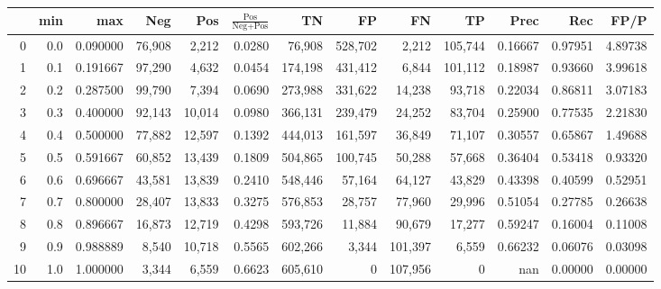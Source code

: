 \begin{tabular}{rrrrrrrrrrrrr}
\toprule
{} &  min &       max &     Neg &     Pos & $\frac{\text{Pos}}{\text{Neg}+\text{Pos}}$ &       TN &       FP &       FN &       TP &     Prec &      Rec &     FP/P \\
\midrule
0  &  0.0 &  0.090000 &  76,908 &   2,212 &                                     0.0280 &   76,908 &  528,702 &    2,212 &  105,744 &  0.16667 &  0.97951 &  4.89738 \\
1  &  0.1 &  0.191667 &  97,290 &   4,632 &                                     0.0454 &  174,198 &  431,412 &    6,844 &  101,112 &  0.18987 &  0.93660 &  3.99618 \\
2  &  0.2 &  0.287500 &  99,790 &   7,394 &                                     0.0690 &  273,988 &  331,622 &   14,238 &   93,718 &  0.22034 &  0.86811 &  3.07183 \\
3  &  0.3 &  0.400000 &  92,143 &  10,014 &                                     0.0980 &  366,131 &  239,479 &   24,252 &   83,704 &  0.25900 &  0.77535 &  2.21830 \\
4  &  0.4 &  0.500000 &  77,882 &  12,597 &                                     0.1392 &  444,013 &  161,597 &   36,849 &   71,107 &  0.30557 &  0.65867 &  1.49688 \\
5  &  0.5 &  0.591667 &  60,852 &  13,439 &                                     0.1809 &  504,865 &  100,745 &   50,288 &   57,668 &  0.36404 &  0.53418 &  0.93320 \\
6  &  0.6 &  0.696667 &  43,581 &  13,839 &                                     0.2410 &  548,446 &   57,164 &   64,127 &   43,829 &  0.43398 &  0.40599 &  0.52951 \\
7  &  0.7 &  0.800000 &  28,407 &  13,833 &                                     0.3275 &  576,853 &   28,757 &   77,960 &   29,996 &  0.51054 &  0.27785 &  0.26638 \\
8  &  0.8 &  0.896667 &  16,873 &  12,719 &                                     0.4298 &  593,726 &   11,884 &   90,679 &   17,277 &  0.59247 &  0.16004 &  0.11008 \\
9  &  0.9 &  0.988889 &   8,540 &  10,718 &                                     0.5565 &  602,266 &    3,344 &  101,397 &    6,559 &  0.66232 &  0.06076 &  0.03098 \\
10 &  1.0 &  1.000000 &   3,344 &   6,559 &                                     0.6623 &  605,610 &        0 &  107,956 &        0 &      nan &  0.00000 &  0.00000 \\
\bottomrule
\end{tabular}
